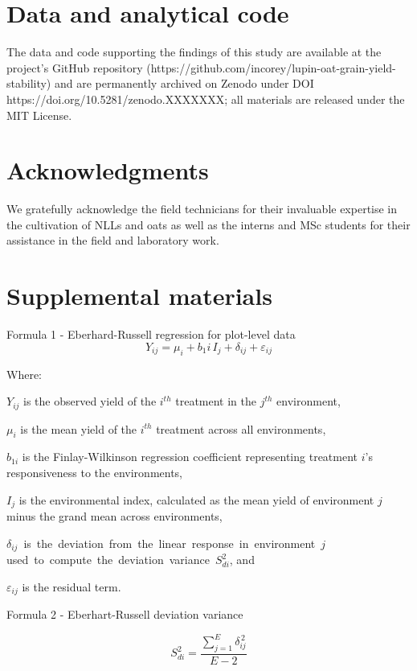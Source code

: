 \documentclass[
  british,
  a4paper,
  DIV=11,
  numbers=noendperiod]{scrreprt}
\begin{document}
\chapter{Data and analytical code}\label{data-and-analytical-code}

The data and code supporting the findings of this study are available at
the project's GitHub repository
(https://github.com/incorey/lupin-oat-grain-yield-stability) and are
permanently archived on Zenodo under DOI
https://doi.org/10.5281/zenodo.XXXXXXX; all materials are released under
the MIT License.

\chapter{Acknowledgments}\label{acknowledgments}

We gratefully acknowledge the field technicians for their invaluable
expertise in the cultivation of NLLs and oats as well as the interns and
MSc students for their assistance in the field and laboratory work.

\chapter{Supplemental materials}\label{supplemental-materials}

Formula 1 - Eberhard-Russell regression for plot-level data \[
Y_{ij} = \mu_i + b_1i\, I_j + \delta_{ij} + \varepsilon_{ij} \tag{1}
\]

Where:

\(Y_{ij}\) is the observed yield of the \(i^{th}\) treatment in the
\(j^{th}\) environment,

\(\mu_i\) is the mean yield of the \(i^{th}\) treatment across all
environments,

\(b_{1i}\) is the Finlay-Wilkinson regression coefficient representing
treatment \(i\)'s responsiveness to the environments,

\(I_j\) is the environmental index, calculated as the mean yield of
environment \(j\) minus the grand mean across environments,

\(\delta_{ij}\)\hspace{0pt}~is~the~deviation~from~the~linear~response~in~environment~\(j\)
used~to~compute~the~deviation~variance~\(S^2_{di}\), and

\(\varepsilon_{ij}\) is the residual term.

Formula 2 - Eberhart-Russell deviation variance

\[
S^2_{di} = \frac{\sum_{j=1}^{E} \delta_{ij}^{\,2}}{E - 2} \tag{2}
\]
\end{document}
